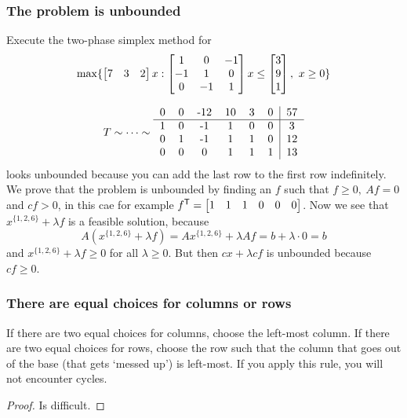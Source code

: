 \documentclass{exam}
\begin{document}
    \subsubsection{The problem is unbounded}
    \begin{question}
        Execute the two-phase simplex method for
        \[
            \max \{ \matrix{7 & 3 & 2} x : \matrix{1 & 0 & -1 \\ -1 & 1 & 0 \\ 0 & -1 & 1} x \le \matrix{3 \\ 9  \\ 1},\ x \ge 0 \}
        \]
    \end{question}
    \begin{answer}
        \[
            T \sim \dots \sim
            \begin{tabular}{cccccc|c}
                0 & 0 & -12 & 10 & 3 & 0 & 57 \\ \hline
                1 & 0 & -1 & 1 & 0 & 0 & 3 \\
                0 & 1 & -1 & 1 & 1 & 0 & 12 \\
                0 & 0 & 0 & 1 & 1 & 1 & 13 \\
            \end{tabular}
        \]
        looks unbounded because you can add the last row to the first row indefinitely.
        We prove that the problem is unbounded by finding an $f$ such that $f \ge 0,\ Af=0$ and $cf >0$, in this cae for example $f^\t = \matrix{1 & 1 & 1 & 0 & 0 & 0}$.
        Now we see that $x^{\{1,2,6\}} + \lambda f$ is a feasible solution, because
        \[
            A (x^{\{1,2,6\}} + \lambda f) = A x^{\{1,2,6\}} + \lambda A f = b + \lambda \cdot 0 = b
        \]
        and $x^{\{1,2,6\}} + \lambda f \ge 0$ for all $\lambda \ge 0$.
        But then $cx + \lambda cf$ is unbounded because $cf \ge 0$.
    \end{answer}

    \subsubsection{There are equal choices for columns or rows}
    \begin{theorem}
        If there are two equal choices for columns, choose the left-most column.
        If there are two equal choices for rows, choose the row such that the column that goes out of the base (that gets `messed up') is left-most.
        If you apply this rule, you will not encounter cycles.
    \end{theorem}
    \begin{proof}
        Is difficult. %
    \end{proof}
\end{document}
